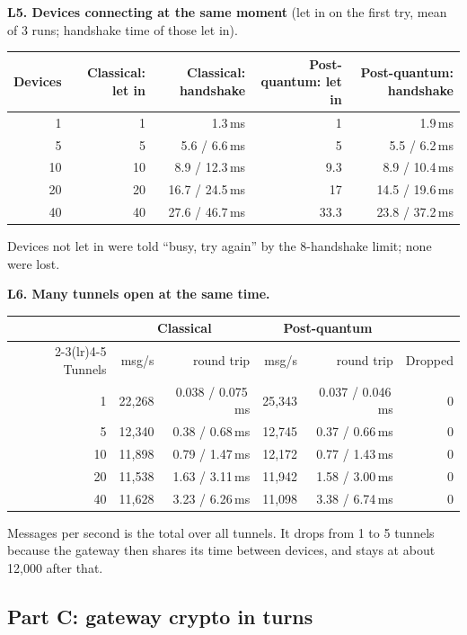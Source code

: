 \documentclass[10pt,a4paper]{article}
\begin{document}
\textbf{L5. Devices connecting at the same moment} (let in on the first try, mean of 3 runs; handshake
time of those let in).
\begin{table}[H]\centering\small
\begin{tabular}{rrrrr}
\toprule
Devices & Classical: let in & Classical: handshake & Post-quantum: let in & Post-quantum: handshake \\
\midrule
1 & 1 & 1.3\,ms & 1 & 1.9\,ms \\
5 & 5 & 5.6 / 6.6\,ms & 5 & 5.5 / 6.2\,ms \\
10 & 10 & 8.9 / 12.3\,ms & 9.3 & 8.9 / 10.4\,ms \\
20 & 20 & 16.7 / 24.5\,ms & 17 & 14.5 / 19.6\,ms \\
40 & 40 & 27.6 / 46.7\,ms & 33.3 & 23.8 / 37.2\,ms \\
\bottomrule
\end{tabular}
\end{table}
Devices not let in were told ``busy, try again'' by the 8-handshake limit; none were lost.

\textbf{L6. Many tunnels open at the same time.}
\begin{table}[H]\centering\small
\begin{tabular}{rrrrrr}
\toprule
 & \multicolumn{2}{c}{Classical} & \multicolumn{2}{c}{Post-quantum} & \\
\cmidrule(lr){2-3}\cmidrule(lr){4-5}
Tunnels & msg/s & round trip & msg/s & round trip & Dropped \\
\midrule
1 & 22,268 & 0.038 / 0.075\,ms & 25,343 & 0.037 / 0.046\,ms & 0 \\
5 & 12,340 & 0.38 / 0.68\,ms & 12,745 & 0.37 / 0.66\,ms & 0 \\
10 & 11,898 & 0.79 / 1.47\,ms & 12,172 & 0.77 / 1.43\,ms & 0 \\
20 & 11,538 & 1.63 / 3.11\,ms & 11,942 & 1.58 / 3.00\,ms & 0 \\
40 & 11,628 & 3.23 / 6.26\,ms & 11,098 & 3.38 / 6.74\,ms & 0 \\
\bottomrule
\end{tabular}
\end{table}
Messages per second is the total over all tunnels. It drops from 1 to 5 tunnels because the gateway
then shares its time between devices, and stays at about 12,000 after that.

\subsection*{Part C: gateway crypto in turns}
\end{document}

